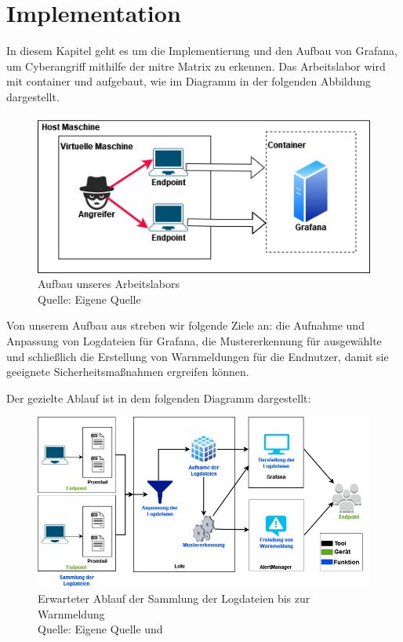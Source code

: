 \section{Implementation}
In diesem Kapitel geht es um die Implementierung und den Aufbau von Grafana, um \gls{Cyberangriff} mithilfe der \gls{mitre} Matrix zu erkennen. Das Arbeitslabor wird mit \gls{container} und  aufgebaut, wie im Diagramm in der folgenden Abbildung dargestellt.

\begin{figure}[H]
   \centering
   \includegraphics[width=1\textwidth]{assets/Arbeitslabor.jpg}
   \caption[Aufbau unseres Arbeitslabors]
   {Aufbau unseres Arbeitslabors \\Quelle: Eigene Quelle}
   \centering
\end{figure}

Von unserem Aufbau aus streben wir folgende Ziele an: die Aufnahme und Anpassung von Logdateien für Grafana, die Mustererkennung für ausgewählte  und schließlich die Erstellung von Warnmeldungen für die Endnutzer, damit sie geeignete Sicherheitsmaßnahmen ergreifen können.

\newpage
Der gezielte Ablauf ist in dem folgenden Diagramm dargestellt:

\begin{figure}[H]
   \centering
   \includegraphics[width=1\textwidth]{assets/Ablauf_grafana2.jpg}
   \caption[Erwarteter Ablauf der Sammlung der Logdateien bis zur Warnmeldung]
   {Erwarteter Ablauf der Sammlung der Logdateien bis zur Warnmeldung \\ Quelle: Eigene Quelle und \citep{Grafana_loki}}
   \centering
\end{figure}

